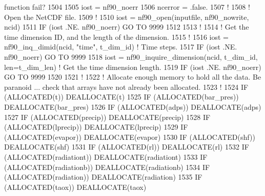 \begin{DoxyCode}
{       function fail?}
1504 
1505     iost    = nf90\_noerr
1506     ncerror = .false.
1507     \textcolor{comment}{!}
1508     \textcolor{comment}{! Open the NetCDF file.}
1509     \textcolor{comment}{!}
1510     iost    = nf90\_open(inputfile, nf90\_nowrite, ncid)
1511     \textcolor{keywordflow}{IF} (iost .NE. nf90\_noerr) \textcolor{keywordflow}{GO TO} 9999
1512 
1513     \textcolor{comment}{!}
1514     \textcolor{comment}{! Get the time dimension ID, and the length of the dimension.}
1515     \textcolor{comment}{!}
1516     iost    = nf90\_inq\_dimid(ncid, \textcolor{stringliteral}{"time"}, t\_dim\_id)                            \textcolor{comment}{! Time steps.}
1517     \textcolor{keywordflow}{IF} (iost .NE. nf90\_noerr) \textcolor{keywordflow}{GO TO} 9999
1518     iost    = nf90\_inquire\_dimension(ncid, t\_dim\_id, len=t\_dim\_len)             \textcolor{comment}{! Get the time dimension
       length.}
1519     \textcolor{keywordflow}{IF} (iost .NE. nf90\_noerr) \textcolor{keywordflow}{GO TO} 9999
1520 
1521     \textcolor{comment}{!}
1522     \textcolor{comment}{! Allocate enough memory to hold all the data. Be paranoid ... check that arrays have not already been
       allocated.}
1523     \textcolor{comment}{!}
1524     \textcolor{keywordflow}{IF} (\textcolor{keyword}{ALLOCATED}(t))           \textcolor{keyword}{DEALLOCATE}(t)
1525     \textcolor{keywordflow}{IF} (\textcolor{keyword}{ALLOCATED}(bar\_pres))    \textcolor{keyword}{DEALLOCATE}(bar\_pres)
1526     \textcolor{keywordflow}{IF} (\textcolor{keyword}{ALLOCATED}(adps))        \textcolor{keyword}{DEALLOCATE}(adps)
1527     \textcolor{keywordflow}{IF} (\textcolor{keyword}{ALLOCATED}(precip))      \textcolor{keyword}{DEALLOCATE}(precip)
1528     \textcolor{keywordflow}{IF} (\textcolor{keyword}{ALLOCATED}(lprecip))     \textcolor{keyword}{DEALLOCATE}(lprecip)
1529     \textcolor{keywordflow}{IF} (\textcolor{keyword}{ALLOCATED}(evapor))      \textcolor{keyword}{DEALLOCATE}(evapor)
1530     \textcolor{keywordflow}{IF} (\textcolor{keyword}{ALLOCATED}(shf))         \textcolor{keyword}{DEALLOCATE}(shf)
1531     \textcolor{keywordflow}{IF} (\textcolor{keyword}{ALLOCATED}(rl))          \textcolor{keyword}{DEALLOCATE}(rl)
1532     \textcolor{keywordflow}{IF} (\textcolor{keyword}{ALLOCATED}(radiationt))  \textcolor{keyword}{DEALLOCATE}(radiationt)
1533     \textcolor{keywordflow}{IF} (\textcolor{keyword}{ALLOCATED}(radiationb))  \textcolor{keyword}{DEALLOCATE}(radiationb)
1534     \textcolor{keywordflow}{IF} (\textcolor{keyword}{ALLOCATED}(radiation))   \textcolor{keyword}{DEALLOCATE}(radiation)
1535     \textcolor{keywordflow}{IF} (\textcolor{keyword}{ALLOCATED}(taox))        \textcolor{keyword}{DEALLOCATE}(taox)

\end{DoxyCode}
